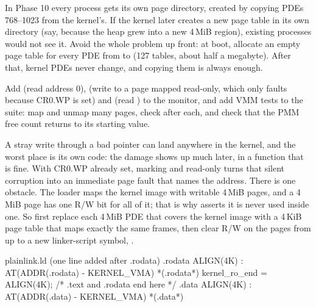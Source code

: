 \documentclass[11pt,a4paper]{article}
\begin{document}
In Phase 10 every process gets its own page directory, created by copying PDEs 768--1023 from the kernel's. If the
kernel later creates a new page table in its own directory (say, because the heap grew into a new 4\,MiB region),
existing processes would not see it. Avoid the whole problem up front: at boot, allocate an empty page table for every PDE
from  to  (127 tables, about half a megabyte). After that, kernel PDEs never change,
and copying them is always enough.

Add  (read address 0),  (write to a page mapped read-only, which only faults
because CR0.WP is set) and  (read ) to the monitor, and add VMM tests to the
suite: map and unmap many pages, check  after each, and check that the PMM free count returns to
its starting value.

A stray write through a bad pointer can land anywhere in the kernel, and the worst place is its own code: the damage
shows up much later, in a function that is fine. With CR0.WP already set, marking  and 
read-only turns that silent corruption into an immediate page fault that names the address. There is one obstacle.
The loader maps the kernel image with writable 4\,MiB pages, and a 4\,MiB page has one R/W bit for all of it; that is
why  asserts it is never used inside one. So first replace each 4\,MiB PDE that covers the kernel image
with a 4\,KiB page table that maps exactly the same frames, then clear R/W on the pages from  up
to a new linker-script symbol, .

\begin{lst}{plain}{link.ld (one line added after .rodata)}
    .rodata ALIGN(4K) : AT(ADDR(.rodata) - KERNEL_VMA) { *(.rodata*) }
    kernel_ro_end = ALIGN(4K);                          /* .text and .rodata end here */
    .data   ALIGN(4K) : AT(ADDR(.data)   - KERNEL_VMA) { *(.data*) }
\end{lst}
\end{document}
